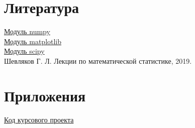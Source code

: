 \documentclass[a4]{article}
\begin{document}
\section{Литература}

\href{https://physics.susu.ru/vorontsov/language/numpy.html}{Модуль numpy}\\

\href{https://matplotlib.org/}{Модуль matplotlib}\\

\href{https://www.scipy.org/}{Модуль scipy}\\

Шевляков Г. Л. Лекции по математической статистике, 2019.


\section{Приложения}

\href{https://github.com/Sergey-Sharapov/MatStat_labs/blob/main/course_project/main.py}{Код курсового проекта}
\end{document}
